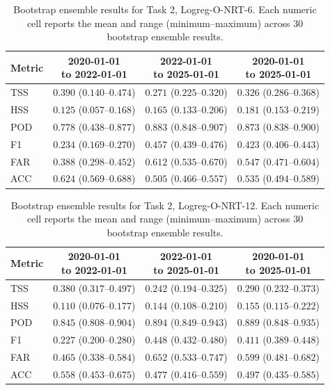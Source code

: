 \begin{table}[htbp]
\centering
\small
\caption{Bootstrap ensemble results for Task 2, Logreg-O-NRT-6. Each numeric cell reports the mean and range (minimum--maximum) across 30 bootstrap ensemble results.}
\label{tab:app-task2-logreg-o-nrt-6}
\begin{tabular}{lccc}
\toprule
Metric & \shortstack{2020-01-01\\to 2022-01-01} & \shortstack{2022-01-01\\to 2025-01-01} & \shortstack{2020-01-01\\to 2025-01-01} \\
\midrule
TSS & $0.390$ ($0.140$--$0.474$) & $0.271$ ($0.225$--$0.320$) & $0.326$ ($0.286$--$0.368$) \\
HSS & $0.125$ ($0.057$--$0.168$) & $0.165$ ($0.133$--$0.206$) & $0.181$ ($0.153$--$0.219$) \\
POD & $0.778$ ($0.438$--$0.877$) & $0.883$ ($0.848$--$0.907$) & $0.873$ ($0.838$--$0.900$) \\
F1 & $0.234$ ($0.169$--$0.270$) & $0.457$ ($0.439$--$0.476$) & $0.423$ ($0.406$--$0.443$) \\
FAR & $0.388$ ($0.298$--$0.452$) & $0.612$ ($0.535$--$0.670$) & $0.547$ ($0.471$--$0.604$) \\
ACC & $0.624$ ($0.569$--$0.688$) & $0.505$ ($0.466$--$0.557$) & $0.535$ ($0.494$--$0.589$) \\
\bottomrule
\end{tabular}
\end{table}
\clearpage

\begin{table}[htbp]
\centering
\small
\caption{Bootstrap ensemble results for Task 2, Logreg-O-NRT-12. Each numeric cell reports the mean and range (minimum--maximum) across 30 bootstrap ensemble results.}
\label{tab:app-task2-logreg-o-nrt-12}
\begin{tabular}{lccc}
\toprule
Metric & \shortstack{2020-01-01\\to 2022-01-01} & \shortstack{2022-01-01\\to 2025-01-01} & \shortstack{2020-01-01\\to 2025-01-01} \\
\midrule
TSS & $0.380$ ($0.317$--$0.497$) & $0.242$ ($0.194$--$0.325$) & $0.290$ ($0.232$--$0.373$) \\
HSS & $0.110$ ($0.076$--$0.177$) & $0.144$ ($0.108$--$0.210$) & $0.155$ ($0.115$--$0.222$) \\
POD & $0.845$ ($0.808$--$0.904$) & $0.894$ ($0.849$--$0.943$) & $0.889$ ($0.848$--$0.935$) \\
F1 & $0.227$ ($0.200$--$0.280$) & $0.448$ ($0.432$--$0.480$) & $0.411$ ($0.389$--$0.448$) \\
FAR & $0.465$ ($0.338$--$0.584$) & $0.652$ ($0.533$--$0.747$) & $0.599$ ($0.481$--$0.682$) \\
ACC & $0.558$ ($0.453$--$0.675$) & $0.477$ ($0.416$--$0.559$) & $0.497$ ($0.435$--$0.585$) \\
\bottomrule
\end{tabular}
\end{table}
\clearpage

